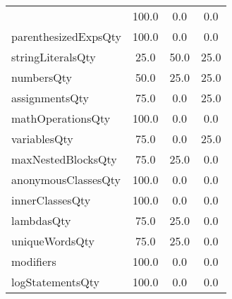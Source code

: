 \begin{tabular}{lccc}
{tryCatchQty & 100.0 & 0.0 & 0.0 \\
parenthesizedExpsQty & 100.0 & 0.0 & 0.0 \\
stringLiteralsQty & 25.0 & 50.0 & 25.0 \\
numbersQty & 50.0 & 25.0 & 25.0 \\
assignmentsQty & 75.0 & 0.0 & 25.0 \\
mathOperationsQty & 100.0 & 0.0 & 0.0 \\
variablesQty & 75.0 & 0.0 & 25.0 \\
maxNestedBlocksQty & 75.0 & 25.0 & 0.0 \\
anonymousClassesQty & 100.0 & 0.0 & 0.0 \\
innerClassesQty & 100.0 & 0.0 & 0.0 \\
lambdasQty & 75.0 & 25.0 & 0.0 \\
uniqueWordsQty & 75.0 & 25.0 & 0.0 \\
modifiers & 100.0 & 0.0 & 0.0 \\
logStatementsQty & 100.0 & 0.0 & 0.0 \\
\bottomrule
              \end{tabular}
            